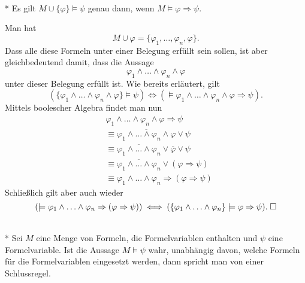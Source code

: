 \begin{Satz}[Deduktionstheorem]\mbox{}\\*
Es gilt $M\cup\{\varphi\}\models\psi$ genau dann, wenn
$M\models\varphi\Rightarrow\psi$.
\end{Satz}
 Man hat
\begin{equation}
M\cup\varphi = \{\varphi_1,\ldots,\varphi_n,\varphi\}.
\end{equation}
Dass alle diese Formeln unter einer Belegung erfüllt sein sollen,
ist aber gleichbedeutend damit, dass die Aussage%
\begin{equation}
\varphi_1\land\ldots\land\varphi_n\land\varphi
\end{equation}
unter dieser Belegung erfüllt ist. Wie bereits erläutert, gilt%
\begin{equation}
(\{\varphi_1\land\ldots\land\varphi_n\land\varphi\}\models\psi)
\iff (\models \varphi_1\land\ldots\land\varphi_n\land\varphi\Rightarrow\psi).
\end{equation}
Mittels boolescher Algebra findet man nun
\begin{align}
& \varphi_1\land\ldots\land\varphi_n\land\varphi\Rightarrow\psi\\
& \equiv \overline{\varphi_1\land\ldots\land\varphi_n\land\varphi}\lor\psi\\
& \equiv \overline{\varphi_1\land\ldots\land\varphi_n}\lor\overline\varphi\lor\psi\\
& \equiv \overline{\varphi_1\land\ldots\land\varphi_n}\lor(\varphi\Rightarrow\psi)\\
& \equiv \varphi_1\land\ldots\land\varphi_n\Rightarrow (\varphi\Rightarrow\psi)
\end{align}
Schließlich gilt aber auch wieder
\begin{equation}
(\models \varphi_1\land\ldots\land\varphi_n\Rightarrow(\varphi\Rightarrow\psi))
\iff (\{\varphi_1\land\ldots\land\varphi_n\}\models\varphi\Rightarrow\psi).\;\Box
\end{equation}

\newpage
\begin{Definition}[Schlussregel]\mbox{}\\*
Sei $M$ eine Menge von Formeln, die Formelvariablen enthalten
und $\psi$ eine Formelvariable. Ist die Aussage $M\models\psi$ wahr,
unabhängig davon, welche
Formeln für die Formelvariablen eingesetzt werden, dann spricht man
von einer Schlussregel.
\end{Definition}

